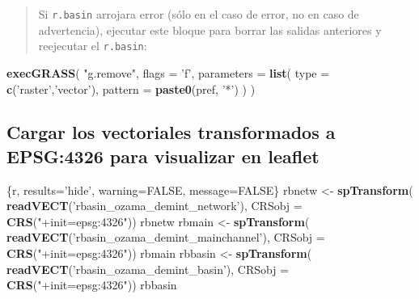 \documentclass[11pt,]{article}
\newenvironment{Shaded}{\begin{snugshade}}{\end{snugshade}}
\newcommand{\KeywordTok}[1]{\textcolor[rgb]{0.13,0.29,0.53}{\textbf{#1}}}
\newcommand{\DataTypeTok}[1]{\textcolor[rgb]{0.13,0.29,0.53}{#1}}
\newcommand{\StringTok}[1]{\textcolor[rgb]{0.31,0.60,0.02}{#1}}
\newcommand{\OtherTok}[1]{\textcolor[rgb]{0.56,0.35,0.01}{#1}}
\newcommand{\NormalTok}[1]{#1}
\begin{document}
\begin{quote}
Si \texttt{r.basin} arrojara error (sólo en el caso de error, no en caso
de advertencia), ejecutar este bloque para borrar las salidas anteriores
y reejecutar el \texttt{r.basin}:
\end{quote}

\begin{Shaded}
\begin{Highlighting}[]
\KeywordTok{execGRASS}\NormalTok{(}
  \StringTok{"g.remove"}\NormalTok{,}
  \DataTypeTok{flags =} \StringTok{'f'}\NormalTok{,}
  \DataTypeTok{parameters =} \KeywordTok{list}\NormalTok{(}
    \DataTypeTok{type =} \KeywordTok{c}\NormalTok{(}\StringTok{'raster'}\NormalTok{,}\StringTok{'vector'}\NormalTok{),}
    \DataTypeTok{pattern =} \KeywordTok{paste0}\NormalTok{(pref, }\StringTok{'*'}\NormalTok{)}
\NormalTok{  )}
\NormalTok{)}
\end{Highlighting}
\end{Shaded}

\subsection{Cargar los vectoriales transformados a EPSG:4326 para
visualizar en
leaflet}\label{cargar-los-vectoriales-transformados-a-epsg4326-para-visualizar-en-leaflet}

\begin{Shaded}
\begin{Highlighting}[]
\NormalTok{    \{r, results=}\StringTok{'hide'}\NormalTok{, warning=}\OtherTok{FALSE}\NormalTok{, message=}\OtherTok{FALSE}\NormalTok{\}}
\NormalTok{rbnetw <-}\StringTok{ }\KeywordTok{spTransform}\NormalTok{(}
  \KeywordTok{readVECT}\NormalTok{(}\StringTok{'rbasin_ozama_demint_network'}\NormalTok{),}
  \DataTypeTok{CRSobj =} \KeywordTok{CRS}\NormalTok{(}\StringTok{"+init=epsg:4326"}\NormalTok{))}
\NormalTok{rbnetw}
\NormalTok{rbmain <-}\StringTok{ }\KeywordTok{spTransform}\NormalTok{(}
  \KeywordTok{readVECT}\NormalTok{(}\StringTok{'rbasin_ozama_demint_mainchannel'}\NormalTok{),}
  \DataTypeTok{CRSobj =} \KeywordTok{CRS}\NormalTok{(}\StringTok{"+init=epsg:4326"}\NormalTok{))}
\NormalTok{rbmain}
\NormalTok{rbbasin <-}\StringTok{ }\KeywordTok{spTransform}\NormalTok{(}
  \KeywordTok{readVECT}\NormalTok{(}\StringTok{'rbasin_ozama_demint_basin'}\NormalTok{),}
  \DataTypeTok{CRSobj =} \KeywordTok{CRS}\NormalTok{(}\StringTok{"+init=epsg:4326"}\NormalTok{))}
\NormalTok{rbbasin}
\end{Highlighting}
\end{Shaded}
\end{document}
